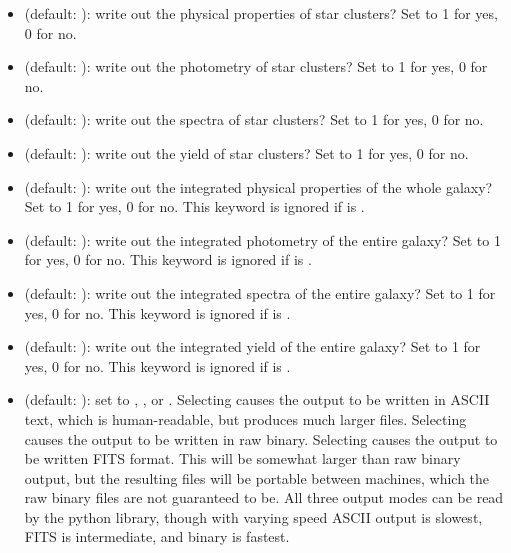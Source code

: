\documentclass[letterpaper,10pt,english]{sphinxmanual}
\begin{document}
\begin{itemize}
\item {} 
 (default: ): write out the physical properties of star clusters? Set to 1 for yes, 0 for no.

\item {} 
 (default: ): write out the photometry of star clusters? Set to 1 for yes, 0 for no.

\item {} 
 (default: ): write out the spectra of star clusters? Set to 1 for yes, 0 for no.

\item {} 
 (default: ): write out the yield of star clusters? Set to 1 for yes, 0 for no.

\item {} 
 (default: ): write out the integrated physical properties of the whole galaxy? Set to 1 for yes, 0 for no. This keyword is ignored if  is .

\item {} 
 (default: ): write out the integrated photometry of the entire galaxy? Set to 1 for yes, 0 for no. This keyword is ignored if  is .

\item {} 
 (default: ): write out the integrated spectra of the entire galaxy? Set to 1 for yes, 0 for no. This keyword is ignored if  is .

\item {} 
 (default: ): write out the integrated yield of the entire galaxy? Set to 1 for yes, 0 for no. This keyword is ignored if  is .

\item {} 
 (default: ): set to , , or . Selecting  causes the output to be written in ASCII text, which is human-readable, but produces much larger files. Selecting  causes the output to be written in raw binary. Selecting  causes the output to be written FITS format. This will be somewhat larger than raw binary output, but the resulting files will be portable between machines, which the raw binary files are not guaranteed to be. All three output modes can be read by the python library, though with varying speed \textendash{} ASCII output is slowest, FITS is intermediate, and binary is fastest.

\end{itemize}
\end{document}

